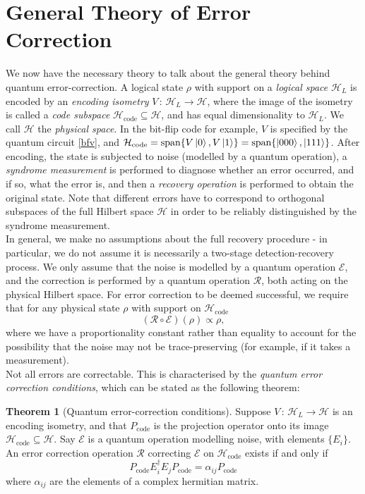 \documentclass[12pt,a4paper]{report}
\numberwithin{equation}{section}
\newcommand{\Pc}{P_{\text{code}}}
\newcommand{\Hcode}{\mathcal{H}_{\text{code}}}
\theoremstyle{definition}
\theoremstyle{theorem}
\newtheorem{theorem}{Theorem}[section]
\theoremstyle{theorem}
\theoremstyle{example}
\theoremstyle{definition}
\begin{document}
\section{General Theory of Error Correction}
We now have the necessary theory to talk about the general theory behind quantum error-correction. A logical state $\rho$ with support on a \textit{logical space} $\mathcal{H}_{L}$ is encoded by an \textit{encoding isometry} $V\,:\,\mathcal{H}_{L}\to\mathcal{H}$, where the image of the isometry is called a \textit{code subspace} $\Hcode\subseteq\mathcal{H}$, and has equal dimensionality to $\mathcal{H}_{L}$. We call $\mathcal{H}$ the \textit{physical space}. In the bit-flip code for example, $V$ is specified by the quantum circuit \ref{bfv}, and  $\Hcode=\text{span}\{V\ket{0},V\ket{1}\}=\text{span}\{\ket{000},\ket{111}\}$. After encoding, the state is subjected to noise (modelled by a quantum operation), a \textit{syndrome measurement} is performed to diagnose whether an error occurred, and if so, what the error is, and then a \textit{recovery operation} is performed to obtain the original state. Note that different errors have to correspond to orthogonal subspaces of the full Hilbert space $\mathcal{H}$ in order to be reliably distinguished by the syndrome measurement.\\
In general, we make no assumptions about the full recovery procedure - in particular, we do not assume it is necessarily a two-stage detection-recovery process. We only assume that the noise is modelled by a quantum operation $\mathcal{E}$, and the correction is performed by a quantum operation $\mathcal{R}$, both acting on the physical Hilbert space. For error correction to be deemed successful, we require that for any physical state $\rho$ with support on $\Hcode$
\begin{equation}
	(\mathcal{R}\circ\mathcal{E})(\rho)\propto\rho,
\end{equation}
where we have a proportionality constant rather than equality to account for the possibility that the noise may not be trace-preserving (for example, if it takes a measurement).\\
Not all errors are correctable. This is characterised by the \textit{quantum error correction conditions}, which can be stated as the following theorem:
\begin{theorem}[Quantum error-correction conditions]\label{QECC}
	Suppose $V\,:\,\mathcal{H}_{L}\to\mathcal{H}$ is an encoding isometry, and that $\Pc$ is the projection operator onto its image $\Hcode\subseteq\mathcal{H}$. Say $\mathcal{E}$ is a quantum operation modelling noise, with elements $\{E_{i}\}$. An error correction operation $\mathcal{R}$ correcting $\mathcal{E}$ on $\Hcode$ exists if and only if
	\begin{equation}\label{QECC1}
		\Pc E_{i}^{\dagger}E_{j}\Pc=\alpha_{ij}\Pc
	\end{equation}
	where $\alpha_{ij}$ are the elements of a complex hermitian matrix.
\end{theorem}
\end{document}
